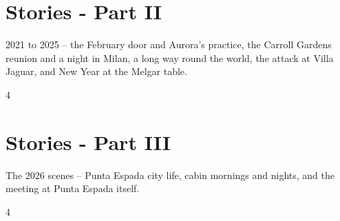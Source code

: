 \documentclass[a4paper,landscape]{memoir}
\begin{document}
\chapter{Stories - Part II}
2021 to 2025 -- the February door and Aurora's practice, the Carroll Gardens reunion and a night in Milan, a long way round the world, the attack at Villa Jaguar, and New Year at the Melgar table.
\clearpage\begin{multicols*}{4}
\end{multicols*}

\chapter{Stories - Part III}
The 2026 scenes -- Punta Espada city life, cabin mornings and nights, and the meeting at Punta Espada itself.
\clearpage\begin{multicols*}{4}
\end{multicols*}
\end{document}
